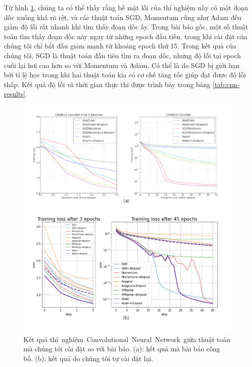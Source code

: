 Từ hình \ref{fig:exp-cnn-best}, chúng ta có thể thấy rằng bề mặt lỗi của thí nghiệm này có một đoạn dốc xuống khá rõ rệt, và các thuật toán SGD, Momentum cũng như Adam đều giảm độ lỗi rất nhanh khi tìm thấy đoạn dốc ấy. Trong bài báo gốc, một số thuật toán tìm thấy đoạn dốc này ngay từ những epoch đầu tiên, trong khi cài đặt của chúng tôi chỉ bắt đầu giảm mạnh từ khoảng epoch thứ 15. Trong kết quả của chúng tôi, SGD là thuật toán đầu tiên tìm ra đoạn dốc, nhưng độ lỗi tại epoch cuối lại hơi cao hơn so với Momentum và Adam. Có thể là do SGD bị giới hạn bởi tỉ lệ học trong khi hai thuật toán kia có cơ chế tăng tốc giúp đạt được độ lỗi thấp. Kết quả độ lỗi và thời gian thực thi được trình bày trong bảng \ref{tab:cnn-results}.

\begin{figure}[H]
	\centering
	\includegraphics[width=140 mm]{images/cnn.png}
	\caption{Kết quả thí nghiệm Convolutional Neural Network giữa thuật toán mà chúng tôi cài đặt so với bài báo. (a): kết quả mà bài báo công bố. (b): kết quả do chúng tôi tự cài đặt lại.}
	\label{fig:exp-cnn-best}
\end{figure}


